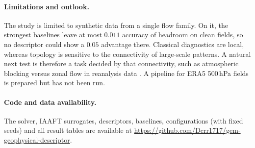 \documentclass[11pt,a4paper]{article}
\begin{document}
\paragraph{Limitations and outlook.} The study is limited to synthetic data
from a single flow family. On it, the strongest baselines leave at most
$0.011$ accuracy of headroom on clean fields, so no descriptor could show a
$0.05$ advantage there. Classical diagnostics are local, whereas topology is
sensitive to the connectivity of large-scale patterns. A natural next test is
therefore a task decided by that connectivity, such as atmospheric blocking
versus zonal flow in reanalysis data \cite{tibaldi1990,davini2012}. A
pipeline for ERA5 500\,hPa fields is prepared but has not been run.

\paragraph{Code and data availability.} The solver, IAAFT surrogates,
descriptors, baselines, configurations (with fixed seeds) and all result
tables are available at
\url{https://github.com/Dcrr1717/gem-geophysical-descriptor}.
\end{document}
